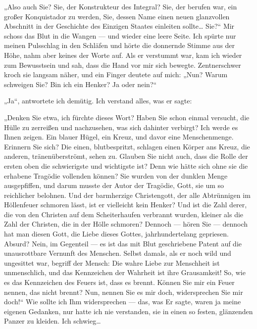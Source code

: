„Also auch Sie? Sie, der Konstrukteur des Integral? Sie, der
berufen war, ein großer Konquistador zu werden, Sie, dessen Name
einen neuen glanzvollen Abschnitt in der Geschichte des Einzigen
Staates einleiten sollte\ldots{} Sie?“ Mir schoss das Blut in die Wangen
— und wieder eine leere Seite. Ich spürte nur meinen Pulsschlag in
den Schläfen und hörte die donnernde Stimme aus der Höhe, nahm aber
keines der Worte auf. Als er verstummt war, kam ich wieder zum
Bewusstsein und sah, dass die Hand vor mir sich bewegte.
Zentnerschwer kroch sie langsam näher, und ein Finger deutete auf
mich: „Nun? Warum schweigen Sie? Bin ich ein Henker? Ja oder
nein?“

„Ja“, antwortete ich demütig. Ich verstand alles, was er sagte:

„Denken Sie etwa, ich fürchte dieses Wort? Haben Sie schon einmal
versucht, die Hülle zu zerreißen und nachzusehen, was sich dahinter
verbirgt? Ich werde es Ihnen zeigen. Ein blauer Hügel, ein Kreuz,
und davor eine Menschenmenge. Erinnern Sie sich? Die einen,
blutbespritzt, schlagen einen Körper ans Kreuz, die anderen,
tränenüberströmt, sehen zu. Glauben Sie nicht auch, dass die Rolle
der ersten oben die schwierigste und wichtigste ist? Denn wie hätte
sich ohne sie die erhabene Tragödie vollenden können? Sie wurden
von der dunklen Menge ausgepfiffen, und darum musste der Autor der
Tragödie, Gott, sie um so reichlicher belohnen. Und der barmherzige
Christengott, der alle Abtrünnigen im Höllenfeuer schmoren lässt,
ist er vielleicht kein Henker? Und ist die Zahl derer, die von den
Christen auf dem Scheiterhaufen verbrannt wurden, kleiner als die
Zahl der Christen, die in der Hölle schmoren? Dennoch — hören Sie —
dennoch hat man diesen Gott, die Liebe dieses Gottes,
jahrhundertelang gepriesen. Absurd? Nein, im Gegenteil — es ist das
mit Blut geschriebene Patent auf die unausrottbare Vernunft des
Menschen. Selbst damals, als er noch wild und ungesittet war,
begriff der Mensch: Die wahre Liebe zur Menschheit ist
unmenschlich, und das Kennzeichen der Wahrheit ist ihre
Grausamkeit! So, wie es das Kennzeichen des Feuers ist, dass es
brennt. Können Sie mir ein Feuer nennen, das nicht brennt? Nun,
nennen Sie es mir doch, widersprechen Sie mir doch!“ Wie sollte ich
Ihm widersprechen — das, was Er sagte, waren ja meine eigenen
Gedanken, nur hatte ich nie verstanden, sie in einen so festen,
glänzenden Panzer zu kleiden. Ich schwieg\ldots{}

